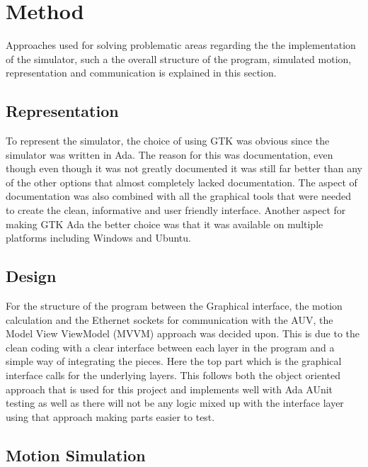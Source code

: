 \section{Method}\label{sec:method}

Approaches used for solving problematic areas regarding the the implementation of the simulator, such a the overall structure of the program, simulated motion, representation and communication is explained in this section.


\subsection{Representation}

To represent the simulator, the choice of using GTK was obvious since the simulator was written in Ada. The reason for this was documentation, even though even though it was not greatly documented it was still far better than any of the other options that almost completely lacked documentation. The aspect of documentation was also combined with all the graphical tools that were needed to create the clean, informative and user friendly interface. Another aspect for making GTK Ada the better choice was that it was available on multiple platforms including Windows and Ubuntu.
\subsection{Design}

For the structure of the program between the Graphical interface, the motion calculation and the Ethernet sockets for communication with the AUV, the Model View ViewModel (MVVM) approach was decided upon. This is due to the clean coding with a clear interface between each layer in the program and a simple way of integrating the pieces. Here the top part which is the graphical interface calls for the underlying layers. This follows both the object oriented approach that is used for this project and implements well with Ada AUnit testing as well as there will not be any logic mixed up with the interface layer using that approach making parts easier to test.
\subsection{Motion Simulation}


